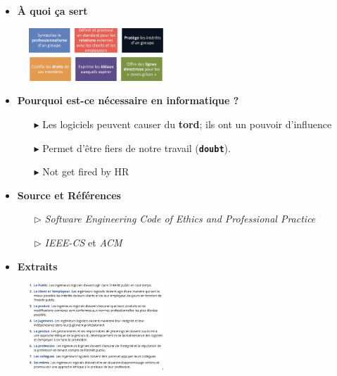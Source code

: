 \documentclass[16pt]{report}
\begin{document}
\begin{multicols*}{2}
    \begin{itemize}
        \item \textbf{À quoi ça sert}  
    \end{itemize}

    \begin{figure}[H]
        \begin{center}
            \includegraphics[width=0.45\textwidth]{Ethique1.png}
        \end{center}
    \end{figure}
    


    \begin{itemize}
        \item \textbf{Pourquoi est-ce nécessaire en informatique ?}  
        \begin{itemize}
            \item[$\blacktriangleright$] Les logiciels peuvent causer du \textbf{tord}; ils ont un pouvoir d'influence 
            \item[$\blacktriangleright$] Permet d'être fiers de notre travail (\textbf{\texttt{doubt}}).
            \item[$\blacktriangleright$] Not get fired by HR
        \end{itemize}
    \end{itemize}


    \begin{itemize}
        \item \textbf{Source et Références}  
        \begin{itemize}
            \item[$\rhd$] \textit{Software Engineering Code of Ethics and Professional Practice}  
            \item[$\rhd$] \textit{IEEE-CS} et \textit{ACM}
        \end{itemize}
    \end{itemize}


    \begin{itemize}
        \item \textbf{Extraits}  
    \end{itemize}


    \begin{figure}[H]
        \begin{center}
            \includegraphics[width=0.45\textwidth]{Ethique2.png}
        \end{center}
    \end{figure}


\end{multicols*}
\end{document}
